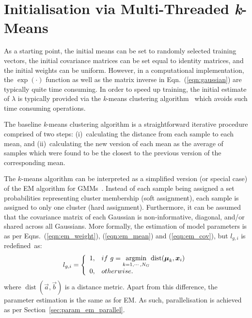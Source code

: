 \section{Initialisation via Multi-Threaded {\it k}-Means}
\label{sec:param_km}

As a starting point, the initial means can be set to randomly selected training vectors,
the initial covariance matrices can be set equal to identity matrices, 
and the initial weights can be uniform.
However, in a computational implementation, the $\exp(\cdot)$ function as well as the matrix inverse in Eqn.~(\ref{eqn:gaussian}) are typically quite time consuming.
In order to speed up training, the initial estimate of $\lambda$ is typically provided via the {\it k}-means clustering algorithm~\cite{Bishop_2006,Duda01,Kulis_2012}
which avoids such time consuming operations.

The baseline {\it k}-means clustering algorithm is a straightforward iterative procedure comprised of two steps:
(i)~calculating the distance from each sample to each mean,
and
(ii)~calculating the new version of each mean as the average of samples which were found to be the closest to the previous version of the corresponding mean.


The $k$-means algorithm can be interpreted as a simplified version (or special case) of the EM algorithm for GMMs~\cite{Kulis_2012}.
Instead of each sample being assigned a set probabilities representing cluster membership (soft assignment),
each sample is assigned to only one cluster (hard assignment).
Furthermore, it can be assumed that the covariance matrix of each Gaussian is non-informative, diagonal, and/or shared across all Gaussians.
More formally, the estimation of model parameters is as per Eqns.~(\ref{eqn:em_weight}), (\ref{eqn:em_mean}) and (\ref{eqn:em_cov}), 
but $l_{g,i}$ is redefined~as:%
%
\begin{equation}
  l_{g,i} = \left\{
  \begin{array}{ll}
  1, & \mbox{if} ~ g = \argmin\limits_{k=1, \cdots, N_G} \operatorname{dist}(\Vec{\mu}_k, \Vec{x}_i) \\
  0, & \mbox{otherwise}.
  \end{array}
  \right.
  \label{eqn:binary_likelihood}
\end{equation}
%
where {$\operatorname{dist}(\Vec{a}, \Vec{b})$} is a distance metric.
Apart from this difference, the parameter estimation is the same as for EM.
As such, parallelisation is achieved as per Section~\ref{sec:param_em_parallel}.

